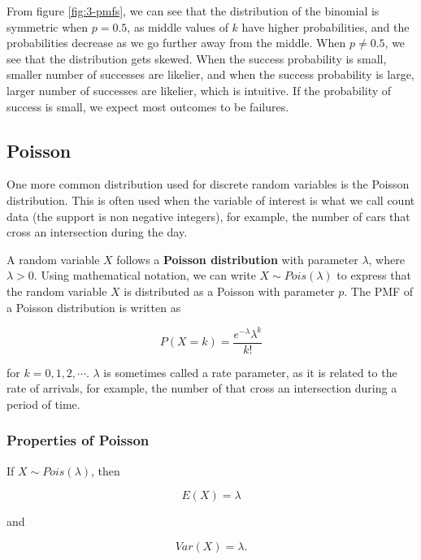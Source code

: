 \documentclass[
]{book}
\begin{document}
From figure \ref{fig:3-pmfs}, we can see that the distribution of the binomial is symmetric when \(p=0.5\), as middle values of \(k\) have higher probabilities, and the probabilities decrease as we go further away from the middle. When \(p \neq 0.5\), we see that the distribution gets skewed. When the success probability is small, smaller number of successes are likelier, and when the success probability is large, larger number of successes are likelier, which is intuitive. If the probability of success is small, we expect most outcomes to be failures.

\subsection{Poisson}\label{poisson}

One more common distribution used for discrete random variables is the Poisson distribution. This is often used when the variable of interest is what we call count data (the support is non negative integers), for example, the number of cars that cross an intersection during the day.

A random variable \(X\) follows a \textbf{Poisson distribution} with parameter \(\lambda\), where \(\lambda>0\). Using mathematical notation, we can write \(X \sim Pois(\lambda)\) to express that the random variable \(X\) is distributed as a Poisson with parameter \(p\). The PMF of a Poisson distribution is written as

\begin{equation} 
P(X=k) = \frac{e^{-\lambda}\lambda^k}{k!} 
\label{eq:3-pois}
\end{equation}

for \(k=0,1,2,\cdots\). \(\lambda\) is sometimes called a rate parameter, as it is related to the rate of arrivals, for example, the number of that cross an intersection during a period of time.

\subsubsection{Properties of Poisson}\label{properties-of-poisson}

If \(X \sim Pois(\lambda)\), then

\begin{equation} 
E(X) = \lambda
\label{eq:3-pois-EX}
\end{equation}

and

\begin{equation} 
Var(X) = \lambda.
\label{eq:3-pois-var}
\end{equation}
\end{document}
